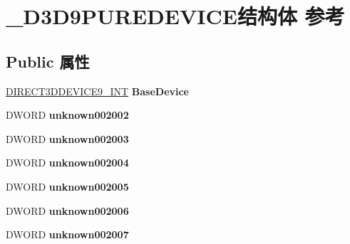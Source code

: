 \hypertarget{struct___d3_d9_p_u_r_e_d_e_v_i_c_e}{}\section{\+\_\+\+D3\+D9\+P\+U\+R\+E\+D\+E\+V\+I\+C\+E结构体 参考}
\label{struct___d3_d9_p_u_r_e_d_e_v_i_c_e}
\subsection*{Public 属性}
\begin{DoxyCompactItemize}
\item 
\mbox{\label{struct___d3_d9_p_u_r_e_d_e_v_i_c_e_aaabf4ddac321557f8cc2d384dc6b13c7}} 
\hyperlink{struct___direct3_d_device9___i_n_t}{D\+I\+R\+E\+C\+T3\+D\+D\+E\+V\+I\+C\+E9\+\_\+\+I\+NT} {\bfseries Base\+Device}
\item 
\mbox{\label{struct___d3_d9_p_u_r_e_d_e_v_i_c_e_af37cfb099222ad7cecc9742666ce85f1}} 
D\+W\+O\+RD {\bfseries unknown002002}
\item 
\mbox{\label{struct___d3_d9_p_u_r_e_d_e_v_i_c_e_a3430aafefabd69ba5d3576865d59c23d}} 
D\+W\+O\+RD {\bfseries unknown002003}
\item 
\mbox{\label{struct___d3_d9_p_u_r_e_d_e_v_i_c_e_a139e1a63628a5ee82d0f8bfbbb3f7b44}} 
D\+W\+O\+RD {\bfseries unknown002004}
\item 
\mbox{\label{struct___d3_d9_p_u_r_e_d_e_v_i_c_e_aab5e9545f3d9e8cc7bb37cfe6c8b5eda}} 
D\+W\+O\+RD {\bfseries unknown002005}
\item 
\mbox{\label{struct___d3_d9_p_u_r_e_d_e_v_i_c_e_abb1aa51a08c332107019531f14ec230a}} 
D\+W\+O\+RD {\bfseries unknown002006}
\item 
\mbox{\label{struct___d3_d9_p_u_r_e_d_e_v_i_c_e_a6e13481220fb550e0fc2fae1d74a9ae0}} 
D\+W\+O\+RD {\bfseries unknown002007}
\item 
\mbox{\label{struct___d3_d9_p_u_r_e_d_e_v_i_c_e_ad43a88ed9c3348f7dcc75b86c38d578f}} 

\end{DoxyCompactItemize}
